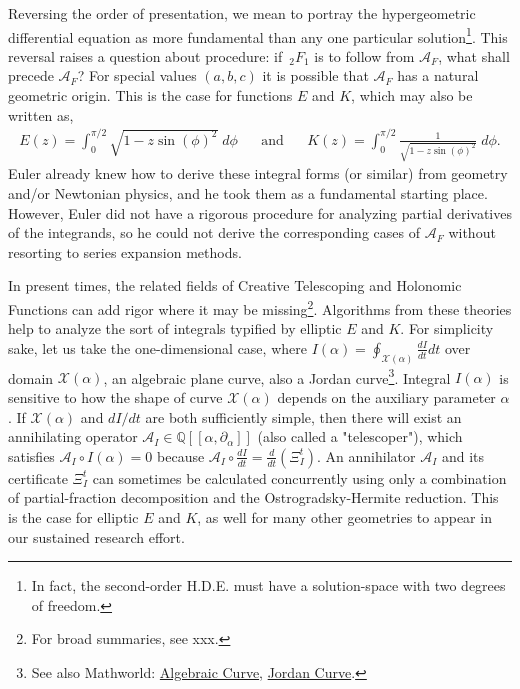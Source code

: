 \documentclass[nofootinbib,preprint]{revtex4-1}
\begin{document}
Reversing the order of presentation, we mean to portray the hypergeometric 
differential equation as more fundamental than any one particular 
solution\footnote{In fact, the second-order H.D.E. must 
have a solution-space with two degrees of freedom.}. This reversal raises 
a question about procedure: if $\,_2F_1$ is to follow from $\mathcal{A}_F$, 
what shall precede $\mathcal{A}_F$? For special values $(a,b,c)$ it is 
possible that $\mathcal{A}_F$ has a natural geometric origin. This is the 
case for functions $E$ and $K$, which may also be written as,
\begin{eqnarray}
 E(z) = \int_0^{\pi/2} \sqrt{1-z \sin(\phi)^2} \; d\phi
\;\;\;\;\;\; \text{and} \;\;\;\;\;\;
 K(z) =  \int_0^{\pi/2} \frac{1}{\sqrt{1-z \sin(\phi)^2}} \; d\phi.  \nonumber   
\end{eqnarray}
Euler already knew how to derive these integral forms (or similar)
from geometry and/or Newtonian physics, and he took them as a fundamental starting place. 
However, Euler did not have a rigorous procedure for analyzing partial 
derivatives of the integrands, so he could not derive the corresponding 
cases of $\mathcal{A}_F$ without resorting to series expansion methods.

In present times, the related fields of Creative Telescoping and Holonomic Functions 
can add rigor where it may be missing\footnote{For broad summaries, see xxx.}. 
Algorithms from these theories help to analyze the sort of integrals typified by 
elliptic $E$ and $K$. For simplicity sake, let us 
take the one-dimensional case, where  $I(\alpha)=\oint_{\mathcal{X}(\alpha)}\frac{dI}{dt}dt$
over domain $\mathcal{X}(\alpha)$, an algebraic plane curve, also a Jordan curve\footnote{See 
also Mathworld:
\href{https://mathworld.wolfram.com/AlgebraicCurve.html}{Algebraic Curve},
\href{https://mathworld.wolfram.com/JordanCurve.html}{Jordan Curve}.}. Integral $I(\alpha)$ is sensitive 
to how the shape of curve $\mathcal{X}(\alpha)$ depends on the auxiliary parameter $\alpha$.
If $\mathcal{X}(\alpha)$ and $dI/dt$ are both sufficiently simple, then there will exist 
an annihilating operator $\mathcal{A}_I \in \mathbb{Q}[\![\alpha, \partial_{\alpha}]\!]$ 
(also called a "telescoper"), which satisfies $\mathcal{A}_I \circ I(\alpha)=0$
because  $\mathcal{A}_I \circ \frac{dI}{dt} = \frac{d}{dt}(\Xi^{t}_I)$. An annihilator 
$\mathcal{A}_I$ and its certificate $\Xi^t_{I}$ can sometimes be calculated 
concurrently using only a combination of partial-fraction decomposition and the 
Ostrogradsky-Hermite reduction. This is the case for elliptic $E$ and $K$, as 
well for many other geometries to appear in our sustained research effort.
\end{document}
